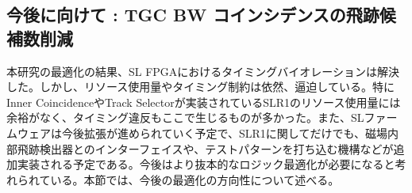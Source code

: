 
\subsection{今後に向けて : TGC BW コインシデンスの飛跡候補数削減}
本研究の最適化の結果、SL FPGAにおけるタイミングバイオレーションは解決した。しかし、リソース使用量やタイミング制約は依然、逼迫している。特にInner CoincidenceやTrack Selectorが実装されているSLR1のリソース使用量には余裕がなく、タイミング違反もここで生じるものが多かった。また、SLファームウェアは今後拡張が進められていく予定で、SLR1に関してだけでも、磁場内部飛跡検出器とのインターフェイスや、テストパターンを打ち込む機構などが追加実装される予定である。今後はより抜本的なロジック最適化が必要になると考れられている。本節では、今後の最適化の方向性について述べる。

